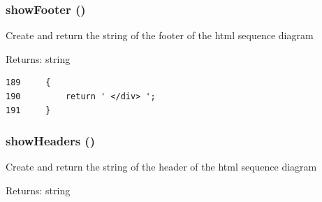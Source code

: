 \hypertarget{class_xml_sequence_printer_diagram_127a1d8b6c21e8271a4332b35923145b}{
\subsubsection[{showFooter}]{\setlength{\rightskip}{0pt plus 5cm}showFooter ()}}
\label{class_xml_sequence_printer_diagram_127a1d8b6c21e8271a4332b35923145b}


Create and return the string of the footer of the html sequence diagram

\begin{Desc}
\item[Returns:]string \end{Desc}


\begin{Code}\begin{verbatim}189     {
190         return ' </div> ';
191     }
\end{verbatim}
\end{Code}


\hypertarget{class_xml_sequence_printer_diagram_82d9e10e8180da3641b19222fb093328}{
\subsubsection[{showHeaders}]{\setlength{\rightskip}{0pt plus 5cm}showHeaders ()}}
\label{class_xml_sequence_printer_diagram_82d9e10e8180da3641b19222fb093328}


Create and return the string of the header of the html sequence diagram

\begin{Desc}
\item[Returns:]string \end{Desc}


